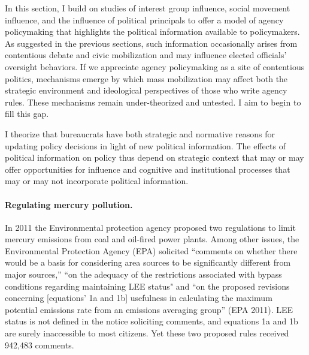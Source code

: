 In this section, I build on studies of interest group influence, social movement influence, and the influence of political principals to offer a model of agency policymaking that highlights the political information available to policymakers. As suggested in the previous sections, such information occasionally arises from contentious debate and civic mobilization and may influence elected officials' oversight behaviors. If we appreciate agency policymaking as a site of contentious politics, mechanisms emerge by which mass mobilization may affect both the strategic environment and ideological perspectives of those who write agency rules. These mechanisms remain under-theorized and untested. I aim to begin to fill this gap.

I theorize that bureaucrats have both strategic and normative reasons for updating policy decisions in light of new political information. The effects of political information on policy thus depend on strategic context that may or may offer opportunities for influence and cognitive and institutional processes that may or may not incorporate political information. 

\paragraph{Regulating mercury pollution.}
In 2011 the Environmental protection agency proposed two regulations to limit mercury emissions from coal and oil-fired power plants. Among other issues, the Environmental Protection Agency (EPA) solicited ``comments on whether there would be a basis for considering area sources to be significantly different from major sources,'' ``on the adequacy of the restrictions associated with bypass conditions regarding maintaining LEE status" and ``on the proposed revisions concerning [equations' 1a and 1b] usefulness in calculating the maximum potential emissions rate from an emissions averaging group'' (EPA 2011). LEE status is not defined in the notice soliciting comments, and equations 1a and 1b are surely inaccessible to most citizens. Yet these two proposed rules received 942,483 comments. 

